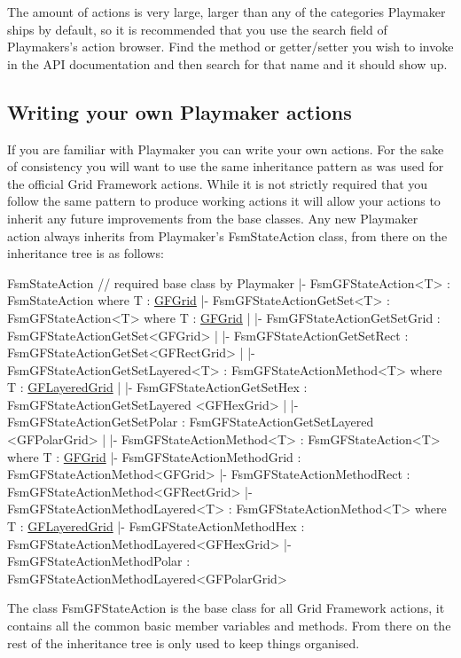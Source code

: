 The amount of actions is very large, larger than any of the categories Playmaker ships by default, so it is recommended that you use the search field of Playmakers's action browser. Find the method or getter/setter you wish to invoke in the A\+P\+I documentation and then search for that name and it should show up.

\subsection*{Writing your own Playmaker actions }

If you are familiar with Playmaker you can write your own actions. For the sake of consistency you will want to use the same inheritance pattern as was used for the official Grid Framework actions. While it is not strictly required that you follow the same pattern to produce working actions it will allow your actions to inherit any future improvements from the base classes. Any new Playmaker action always inherits from Playmaker's {\ttfamily Fsm\+State\+Action} class, from there on the inheritance tree is as follows\+:


\begin{DoxyCode}
FsmStateAction \textcolor{comment}{// required base class by Playmaker}
|- FsmGFStateAction<T> : FsmStateAction where T : \hyperlink{class_g_f_grid}{GFGrid}
   |- FsmGFStateActionGetSet<T> : FsmGFStateAction<T> where T : \hyperlink{class_g_f_grid}{GFGrid}
   |  |- FsmGFStateActionGetSetGrid : FsmGFStateActionGetSet<GFGrid>
   |  |- FsmGFStateActionGetSetRect : FsmGFStateActionGetSet<GFRectGrid>
   |  |- FsmGFStateActionGetSetLayered<T> : FsmGFStateActionMethod<T> where T : 
      \hyperlink{class_g_f_layered_grid}{GFLayeredGrid}
   |     |- FsmGFStateActionGetSetHex : FsmGFStateActionGetSetLayered <GFHexGrid>
   |     |- FsmGFStateActionGetSetPolar : FsmGFStateActionGetSetLayered <GFPolarGrid>
   |
   |- FsmGFStateActionMethod<T> : FsmGFStateAction<T> where T : \hyperlink{class_g_f_grid}{GFGrid}
      |- FsmGFStateActionMethodGrid : FsmGFStateActionMethod<GFGrid>
      |- FsmGFStateActionMethodRect : FsmGFStateActionMethod<GFRectGrid>
      |- FsmGFStateActionMethodLayered<T> : FsmGFStateActionMethod<T> where T : 
      \hyperlink{class_g_f_layered_grid}{GFLayeredGrid}
         |- FsmGFStateActionMethodHex : FsmGFStateActionMethodLayered<GFHexGrid>
         |- FsmGFStateActionMethodPolar : FsmGFStateActionMethodLayered<GFPolarGrid>
\end{DoxyCode}


The class {\ttfamily Fsm\+G\+F\+State\+Action} is the base class for all Grid Framework actions, it contains all the common basic member variables and methods. From there on the rest of the inheritance tree is only used to keep things organised.

